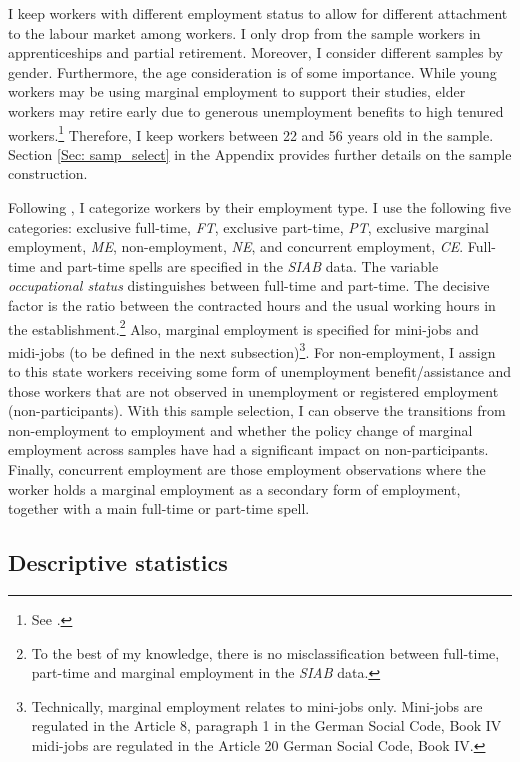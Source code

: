 \documentclass[12pt, a4paper]{article}
\let\Oldsubsection\subsection
\renewcommand{\subsection}{\FloatBarrier\Oldsubsection}
\begin{document}
I keep workers with different employment status to allow for different attachment to the labour market among workers. I only drop from the sample workers in apprenticeships and partial retirement. Moreover, I consider different samples by gender. Furthermore, the age consideration is of some importance. While young workers may be using marginal employment to support their studies, elder workers may retire early due to generous unemployment benefits to high tenured workers.\footnote{See \cite{ArBo02}.} Therefore, I keep workers between 22 and 56 years old in the sample. Section \ref{Sec: samp_select} in the Appendix provides further details on the sample construction.

Following \cite{CaLaRo18}, I categorize workers by their employment type. I use the following five categories: exclusive full-time, \emph{FT}, exclusive part-time, \emph{PT}, exclusive marginal employment, \emph{ME}, non-employment, \emph{NE}, and concurrent employment, \emph{CE}. Full-time and part-time spells are specified in the \emph{SIAB} data. The variable \emph{occupational status} distinguishes between full-time and part-time. The decisive factor is the ratio between the contracted hours and the usual working hours in the establishment.\footnote{To the best of my knowledge, there is no misclassification between full-time, part-time and marginal employment in the \emph{SIAB} data.} Also, marginal employment is specified for mini-jobs and midi-jobs (to be defined in the next subsection)\footnote{Technically, marginal employment relates to mini-jobs only. Mini-jobs are regulated in the Article 8, paragraph 1 in the German Social Code, Book IV midi-jobs are regulated in the Article 20 German Social Code, Book IV.}. For non-employment, I assign to this state workers receiving some form of unemployment benefit/assistance and those workers that are not observed in unemployment or registered employment (non-participants). With this sample selection, I can observe the transitions from non-employment to employment and whether the policy change of marginal employment across samples have had a significant impact on non-participants. Finally, concurrent employment are those employment observations where the worker holds a marginal employment as a secondary form of employment, together with a main full-time or part-time spell.

\subsection{Descriptive statistics}\label{Sec:data_descriptives}
\end{document}
